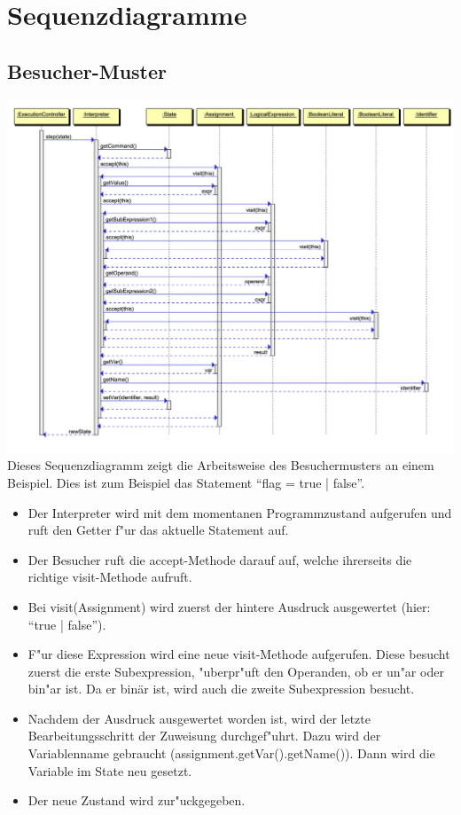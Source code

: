 \documentclass[10pt,a4paper,titlepage]{article}
\begin{document}
\section{Sequenzdiagramme}
\subsection{Besucher-Muster}
\includegraphics[scale=0.9]{images/Visitor_Pattern.pdf} \newline
Dieses Sequenzdiagramm zeigt die Arbeitsweise des Besuchermusters an einem Beispiel. Dies ist zum Beispiel das Statement "`flag = true | false"'.
\begin{itemize}
\item Der Interpreter wird mit dem momentanen Programmzustand aufgerufen und ruft den Getter f"ur das aktuelle Statement auf.
\item Der Besucher ruft die accept-Methode darauf auf, welche ihrerseits die richtige visit-Methode aufruft.
\item Bei visit(Assignment) wird zuerst der hintere Ausdruck ausgewertet (hier: "`true | false"').
\item F"ur diese Expression wird eine neue visit-Methode aufgerufen. Diese besucht zuerst die erste Subexpression, "uberpr"uft den Operanden, ob er un"ar oder bin"ar ist. Da er binär ist, wird auch die zweite Subexpression besucht.
\item Nachdem der Ausdruck ausgewertet worden ist, wird der letzte Bearbeitungsschritt der Zuweisung durchgef"uhrt. Dazu wird der Variablenname gebraucht (assignment.getVar().getName()). Dann wird die Variable im State neu gesetzt.
\item Der neue Zustand wird zur"uckgegeben.
\end{itemize}
\end{document}
